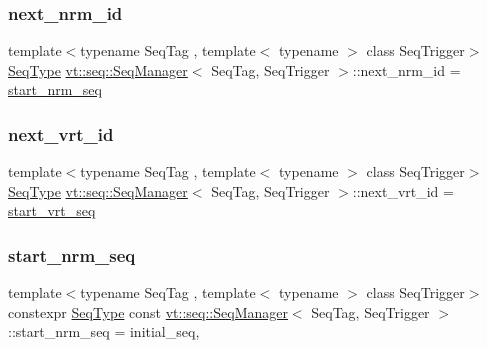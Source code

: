 \subsubsection{\texorpdfstring{next\+\_\+nrm\+\_\+id}{next\_nrm\_id}}
{\footnotesize\ttfamily template$<$typename Seq\+Tag , template$<$ typename $>$ class Seq\+Trigger$>$ \\
\hyperlink{structvt_1_1seq_1_1_seq_manager_a46a40595599aa666e9cf9f46ee30cfde}{Seq\+Type} \hyperlink{structvt_1_1seq_1_1_seq_manager}{vt\+::seq\+::\+Seq\+Manager}$<$ Seq\+Tag, Seq\+Trigger $>$\+::next\+\_\+nrm\+\_\+id = \hyperlink{structvt_1_1seq_1_1_seq_manager_a71ef8ed323c68ade7d3b46b99c81846d}{start\+\_\+nrm\+\_\+seq}\hspace{0.3cm}{\ttfamily [private]}}

\mbox{\label{structvt_1_1seq_1_1_seq_manager_aa76d48546de0c1eba39bd44212f554b4}} 
\subsubsection{\texorpdfstring{next\+\_\+vrt\+\_\+id}{next\_vrt\_id}}
{\footnotesize\ttfamily template$<$typename Seq\+Tag , template$<$ typename $>$ class Seq\+Trigger$>$ \\
\hyperlink{structvt_1_1seq_1_1_seq_manager_a46a40595599aa666e9cf9f46ee30cfde}{Seq\+Type} \hyperlink{structvt_1_1seq_1_1_seq_manager}{vt\+::seq\+::\+Seq\+Manager}$<$ Seq\+Tag, Seq\+Trigger $>$\+::next\+\_\+vrt\+\_\+id = \hyperlink{structvt_1_1seq_1_1_seq_manager_aae6446338964093292b8dcaa79d77f96}{start\+\_\+vrt\+\_\+seq}\hspace{0.3cm}{\ttfamily [private]}}

\mbox{\label{structvt_1_1seq_1_1_seq_manager_a71ef8ed323c68ade7d3b46b99c81846d}} 
\subsubsection{\texorpdfstring{start\+\_\+nrm\+\_\+seq}{start\_nrm\_seq}}
{\footnotesize\ttfamily template$<$typename Seq\+Tag , template$<$ typename $>$ class Seq\+Trigger$>$ \\
constexpr \hyperlink{structvt_1_1seq_1_1_seq_manager_a46a40595599aa666e9cf9f46ee30cfde}{Seq\+Type} const \hyperlink{structvt_1_1seq_1_1_seq_manager}{vt\+::seq\+::\+Seq\+Manager}$<$ Seq\+Tag, Seq\+Trigger $>$\+::start\+\_\+nrm\+\_\+seq = initial\+\_\+seq\hspace{0.3cm}{\ttfamily [static]}, {\ttfamily [private]}}

